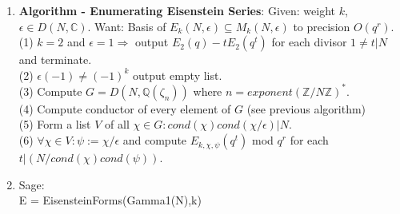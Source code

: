 \documentclass{article}
\newcommand{\Q}{\mathbb{Q}}
\newcommand{\C}{\mathbb{C}}
\newcommand{\Z}{\mathbb{Z}}
\newcommand{\Ra}{\Rightarrow}
\begin{document}
\begin{multicols}{2}
\begin{enumerate}
\item \textbf{Algorithm - Enumerating Eisenstein Series}: Given: weight $k$, $\epsilon \in D(N,\C)$. Want: Basis of $E_k(N,\epsilon) \subseteq M_k(N,\epsilon)$ to precision $O(q^r)$.\\

(1) $k = 2$ and $\epsilon = 1 \Ra$ output $E_2(q) - tE_2(q^t)$ for each divisor $1 \neq t|N$ and terminate. \\
(2) $\epsilon(-1) \neq (-1)^k$ output empty list.\\
(3) Compute $G = D(N, \Q(\zeta_n))$ where $n = exponent(\Z/N\Z)^*$.\\
(4) Compute conductor of every element of $G$ (see previous algorithm)\\
(5) Form a list $V$ of all $\chi \in G: cond(\chi)cond(\chi/\epsilon)|N$.\\
(6) $\forall \chi \in V: \psi:=\chi/\epsilon$ and compute $E_{k,\chi,\psi}(q^t)$ mod $q^r$ for each $t|(N/cond(\chi)cond(\psi))$.\\


\item Sage: \\
E = EisensteinForms(Gamma1(N),k)\\

\end{enumerate}
\end{multicols}
\end{document}

